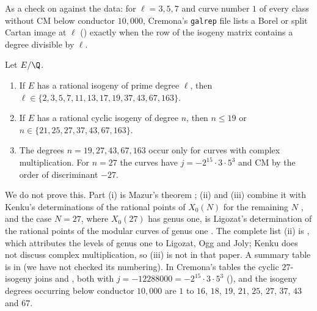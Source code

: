 \noindent As a check on  against the data: for $\ell=3,5,7$ and curve number $1$ of every class without CM below conductor $10{,}000$, Cremona's
\texttt{galrep} file lists a Borel or split Cartan image at $\ell$ () exactly when the row of the isogeny matrix contains a degree divisible by $\ell$.

\begin{theorem}\label{thm:ellcurves:mazurkenku}
Let $E/\Q$.
\begin{enumerate}[label=(\roman*)]
\item If $E$ has a rational isogeny of prime degree $\ell$, then $\ell\in\{2,3,5,7,11,13,17,19,37,43,67,163\}$.
\item If $E$ has a rational cyclic isogeny of degree $n$, then $n\le19$ or $n\in\{21,25,27,37,43,67,163\}$.
\item The degrees $n=19,27,43,67,163$ occur only for curves with complex multiplication. For $n=27$ the curves have $j=-2^{15}\cdot3\cdot5^3$ and CM by the order of discriminant $-27$.
\end{enumerate}
\end{theorem}

\noindent We do not prove this. Part (i) is Mazur's theorem \cite{Mazur78}; (ii) and (iii) combine it with Kenku's determinations of the rational points of $X_0(N)$ for the
remaining $N$ \cite{Kenku79,Kenku80a,Kenku80b,Kenku81}, and the case $N=27$, where $X_0(27)$ has genus one, is Ligozat's determination of the rational points of the modular curves of genus one \cite{Ligozat75}. The complete list (ii) is \cite[Theorem 1]{Kenku}, which attributes the levels of genus one to Ligozat, Ogg and Joly; Kenku does not discuss complex multiplication, so (iii) is not in that paper. A summary table is in \cite{LozanoRobledo13} (we have not checked its numbering). In Cremona's tables the cyclic $27$-isogeny joins  and , both with
$j=-12288000=-2^{15}\cdot3\cdot5^3$ (), and the isogeny degrees occurring below conductor $10{,}000$ are $1$ to $16$, $18$, $19$, $21$, $25$, $27$, $37$, $43$ and $67$.

